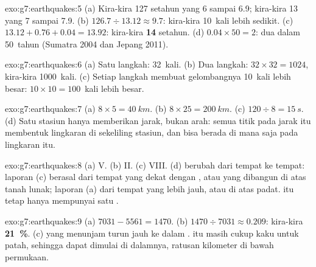 \begin{solution}{exo:g7:earthquakes:5}
(a) Kira-kira 127 setahun yang  6 sampai 6.9; kira-kira 13 yang
 7 sampai 7.9. (b) $126.7 \div 13.12 \approx 9.7$: kira-kira
10~kali lebih sedikit. (c) $13.12 + 0.76 + 0.04 = 13.92$: kira-kira
\textbf{14} setahun. (d) $0.04 \times 50 = 2$: dua dalam 50~tahun (Sumatra
2004 dan Jepang 2011).
\end{solution}

\begin{solution}{exo:g7:earthquakes:6}
(a) Satu langkah: 32~kali. (b) Dua langkah: $32 \times 32 = 1024$,
kira-kira 1000~kali. (c) Setiap langkah membuat gelombangnya 10~kali lebih
besar: $10 \times 10 =
100$~kali lebih besar.
\end{solution}

\begin{solution}{exo:g7:earthquakes:7}
(a) $8 \times 5 = \qty{40}{km}$. (b) $8 \times 25 = \qty{200}{km}$. (c)
$120 \div 8 = \qty{15}{s}$. (d) Satu stasiun hanya memberikan jarak, bukan
arah: semua titik pada jarak itu membentuk lingkaran di sekeliling
stasiun, dan  bisa berada di mana saja pada lingkaran itu.
\end{solution}

\begin{solution}{exo:g7:earthquakes:8}
(a) V. (b) II. (c) VIII. (d)  berubah dari tempat ke tempat:
laporan (c) berasal dari tempat yang dekat dengan , atau yang
dibangun di atas tanah lunak; laporan (a) dari tempat yang lebih jauh,
atau di atas  padat.  itu tetap hanya mempunyai satu
.
\end{solution}

\begin{solution}{exo:g7:earthquakes:9}
(a) $7031 - 5561 = 1470$. (b) $1470 \div 7031 \approx 0.209$: kira-kira
\textbf{21~\%}. (c)  yang menunjam turun jauh ke dalam .
 itu masih cukup kaku untuk patah, sehingga  dapat
dimulai di dalamnya, ratusan kilometer di bawah permukaan.
\end{solution}

